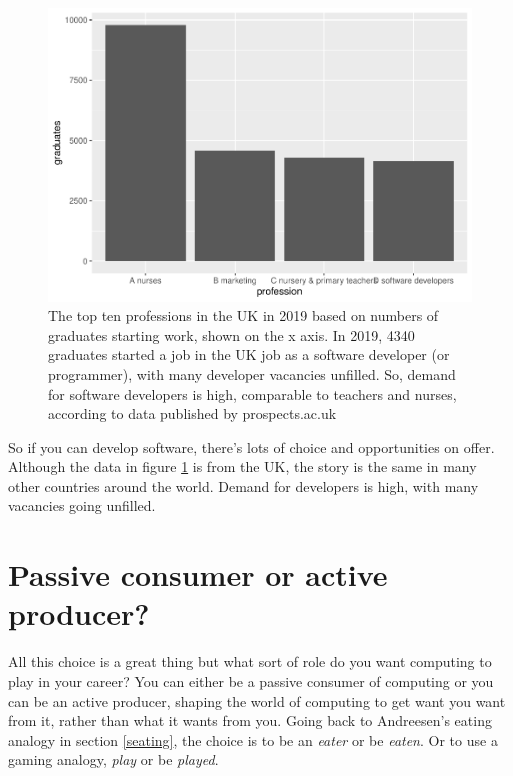 \documentclass[
]{book}
\begin{document}
\begin{figure}

{\centering \includegraphics[width=1\linewidth]{cdyf_files/figure-latex/nurses-fig-1} 

}

\caption{The top ten professions in the UK in 2019 based on numbers of graduates starting work, shown on the x axis. In 2019, 4340 graduates started a job in the UK job as a software developer (or programmer), with many developer vacancies unfilled. So, demand for software developers is high, comparable to teachers and nurses, according to data published by prospects.ac.uk \citep{labourmarket2022}}\label{fig:nurses-fig}
\end{figure}



So if you can develop software, there's lots of choice and opportunities on offer. Although the data in figure \ref{fig:nurses-fig} is from the UK, the story is the same in many other countries around the world. Demand for developers is high, with many vacancies going unfilled.

\hypertarget{passive}{%
\section{Passive consumer or active producer?}\label{passive}}

All this choice is a great thing but what sort of role do you want computing to play in your career? You can either be a passive consumer of computing or you can be an active producer, shaping the world of computing to get want you want from it, rather than what it wants from you. Going back to Andreesen's eating analogy in section \ref{seating}, the choice is to be an \emph{eater} or be \emph{eaten}. Or to use a gaming analogy, \emph{play} or be \emph{played}.
\end{document}
